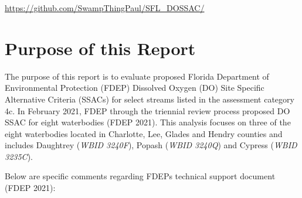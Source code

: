 \documentclass[]{interact}
\theoremstyle{plain}%
\theoremstyle{definition}
\theoremstyle{remark}
\begin{document}
\begin{github}
\url{https://github.com/SwampThingPaul/SFL_DOSSAC/}
\end{github}

\newpage

\hypertarget{purpose-of-this-report}{%
\section{Purpose of this Report}\label{purpose-of-this-report}}

The purpose of this report is to evaluate proposed Florida Department of
Environmental Protection (FDEP) Dissolved Oxygen (DO) Site Specific
Alternative Criteria (SSACs) for select streams listed in the assessment
category 4c. In February 2021, FDEP through the triennial review process
proposed DO SSAC for eight waterbodies (FDEP 2021). This analysis
focuses on three of the eight waterbodies located in Charlotte, Lee,
Glades and Hendry counties and includes Daughtrey (\textit{WBID 3240F}),
Popash (\textit{WBID 3240Q}) and Cypress (\textit{WBID 3235C}).

Below are specific comments regarding FDEPs technical support document
(FDEP 2021):
\end{document}
